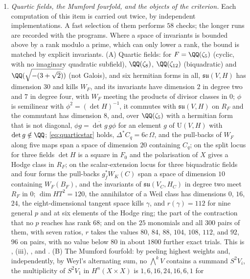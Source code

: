 \begin{enumerate}[label=\textup{(\Roman*)},leftmargin=*]
\item \emph{Quartic fields, the Mumford fourfold, and the objects of the
  criterion.} Each computation of this item is carried out twice, by
  independent implementations. A fast selection of them performs $58$
  checks; the longer runs are recorded with the programs. Where a space of
  invariants is bounded above by a rank modulo a prime, which can only lower
  a rank, the bound is matched by explicit invariants. (A) Quartic fields:
  for $F=\QQ(\zeta_{5})$ (cyclic, with no imaginary quadratic subfield),
  $\QQ(\zeta_{8})$, $\QQ(\zeta_{12})$ (biquadratic) and
  $\QQ(\sqrt{-(3+\sqrt2)})$ (not Galois), and six hermitian forms in all,
  $\mathfrak{su}(V,H)$ has dimension $30$ and kills $W_{F}$, and its
  invariants have dimension $2$ in degree two and $7$ in degree four, with
  $W_{F}$ meeting the products of divisor classes in $0$; $\phi$ is
  semilinear with $\phi^{2}=(\det H)^{-1}$, it commutes with $\mathfrak{su}(V,H)$
  on $R_{F}$ and the commutant has dimension $8$, and, over $\QQ(\zeta_{5})$
  with a hermitian form that is not diagonal,
  $\phi g=\overline{\det g}\,g\phi$ for an element $g$ of $\mathrm{U}(V,H)$ with $\det g\notin\QQ$;
  \eqref{eq:quarticstar} holds, $\Delta^{*}C_{q}=6c\,\Omega$, and the
  pull-backs of $W_{F}$ along five maps span a space of dimension $20$
  containing $C_{q}$; on the split locus for three fields $\det H$ is a square
  in $F_{0}$ and the polarisation of $X$ gives a Hodge class in $R_{F}$; on
  the scalar-extension locus for three biquadratic fields and four forms the
  pull-backs $g_{f}^{*}W_{K}(C)$ span a space of dimension $10$ containing
  $W_{F}(B_{F})$, and the invariants of $\mathfrak{su}(V_{C},H_{C})$ in degree
  two meet $R_{F}$ in $0$; $\dim HT^{2}=120$, the annihilator of a Weil class
  has dimensions $0$, $16$, $24$, the eight-dimensional tangent space kills
  $\gamma$, and $r(\gamma)=112$ for nine general $p$ and at six elements of
  the Hodge ring; the part of the contraction that no $p$ reaches has rank
  $68$; and on the $25$ monomials and all $300$ pairs of them, with seven ratios, $r$ takes the values $80$,
  $84$, $88$, $104$, $108$, $112$, and $92$, $96$ on pairs, with no value
  below $80$ in about $1800$ further exact trials. This is
  , (iii),
  ,  and
  . (B) The Mumford fourfold: by peeling highest
  weights and, independently, by Weyl's alternating sum, no
  $\bigwedge^{k}V$ contains a summand $S^{2}V_{i}$, the multiplicity of
  $S^{2}V_{1}$ in $H^{n}(X\times X)$ is $1,6,16,24,16,6,1$ for

\end{enumerate}
